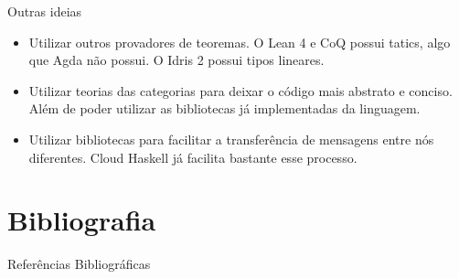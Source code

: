 \documentclass{beamer}
\begin{document}
\begin{frame}{Outras ideias}
  \begin{itemize}
  \item  Utilizar outros provadores de teoremas.
    O Lean 4 e CoQ possui tatics, algo que Agda não possui.
    O Idris 2 possui tipos lineares. 
  \item Utilizar teorias das categorias para deixar o código mais abstrato e conciso.
    Além de poder utilizar as bibliotecas já implementadas da linguagem.
  \item Utilizar bibliotecas para facilitar a transferência de mensagens entre nós diferentes.
    Cloud Haskell já facilita bastante esse processo.
  \end{itemize}
\end{frame}


\section{Bibliografia}

\begin{frame}{Referências Bibliográficas}
  
  
\end{frame}
\end{document}
